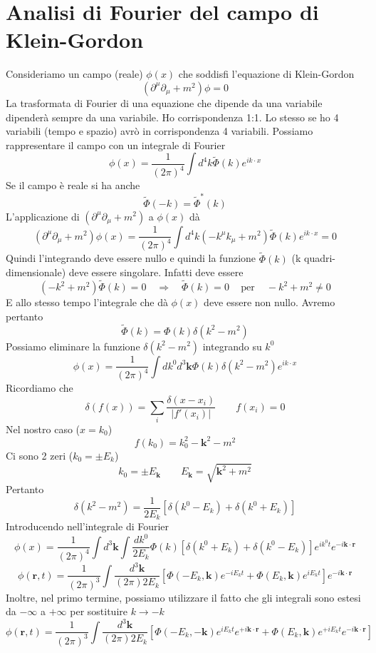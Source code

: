 \section{Analisi di Fourier del campo di Klein-Gordon}
Consideriamo un campo (reale) $\phi(x)$ che soddisfi l'equazione di Klein-Gordon
$$
(\partial^\mu \partial_\mu + m^2)\phi = 0
$$
La trasformata di Fourier di una equazione che dipende da una variabile dipenderà sempre da una variabile. Ho corrispondenza 1:1. Lo stesso se ho 4 variabili (tempo e spazio) avrò in corrispondenza 4 variabili.
Possiamo rappresentare il campo con un integrale di Fourier
$$
\phi(x) = \frac{1}{(2\pi)^4} \int d^4k \tilde{\Phi}(k) e^{ik \cdot x}
$$
Se il campo è reale si ha anche 
$$
\tilde{\Phi}(-k) = \tilde{\Phi}^*(k)
$$
L'applicazione di $\left(\partial^\mu\partial_\mu+m^2\right)$ a $\phi(x)$ dà
$$
(\partial^\mu \partial_\mu + m^2)\phi(x) = \frac{1}{(2\pi)^4} \int d^4k (-k^\mu k_\mu + m^2) \tilde{\Phi}(k) e^{ik \cdot x} = 0
$$
Quindi l'integrando deve essere nullo e quindi la funzione $\tilde{\Phi}(k)$ (k quadri-dimensionale) deve essere singolare. Infatti deve essere
$$
(-k^2 + m^2) \tilde{\Phi}(k) = 0 \quad \Rightarrow \quad \tilde{\Phi}(k)=0\,\,\,\,\, \text{ per } \,\,\,\,\,-k^2+m^2\not=0
$$
E allo stesso tempo l'integrale che dà $\phi(x)$ deve essere non nullo. Avremo pertanto
$$
\tilde{\Phi}(k) = \Phi(k) \delta(k^2 - m^2)
$$
Possiamo eliminare la funzione $\delta(k^2 - m^2)$ integrando su $k^0$
$$
\phi(x) = \frac{1}{(2\pi)^4} \int dk^0 d^3\mathbf{k} \Phi(k) \delta(k^2 - m^2) e^{ik \cdot x}
$$
Ricordiamo che
$$
\delta(f(x)) = \sum_i \frac{\delta(x - x_i)}{|f'(x_i)|} \qquad f(x_i) = 0
$$
Nel nostro caso ($x=k_0$)
$$
f(k_0) = k_0^2 - \mathbf{k}^2 - m^2
$$
Ci sono 2 zeri ($k_0=\pm E_k$)
$$
k_0 = \pm E_{\mathbf{k}} \qquad E_{\mathbf{k}} = \sqrt{\mathbf{k}^2 + m^2}
$$
Pertanto
$$
\delta(k^2 - m^2) = \frac{1}{2E_k} [\delta(k^0 - E_k) + \delta(k^0 + E_k)]
$$
Introducendo nell'integrale di Fourier
$$
\phi(x) = \frac{1}{(2\pi)^4} \int d^3\mathbf{k} \int \frac{dk^0}{2E_k} \Phi(k) [\delta(k^0 + E_k) + \delta(k^0 - E_k)] e^{ik^0t} e^{-i\mathbf{k}\cdot\mathbf{r}}
$$
$$
\phi(\mathbf{r}, t) = \frac{1}{(2\pi)^3} \int \frac{d^3\mathbf{k}}{(2\pi)2E_k} [\Phi(-E_k, \mathbf{k}) e^{-iE_k t} + \Phi(E_k, \mathbf{k}) e^{iE_k t}] e^{-i\mathbf{k}\cdot\mathbf{r}}
$$
Inoltre, nel primo termine, possiamo utilizzare il fatto che gli integrali sono estesi da $-\infty$ a $+\infty$ per sostituire $k\to-k$
$$
\phi(\mathbf{r}, t) = \frac{1}{(2\pi)^3} \int \frac{d^3\mathbf{k}}{(2\pi)2E_k} [\Phi(-E_k, -\mathbf{k}) e^{iE_k t} e^{+i\mathbf{k}\cdot\mathbf{r}} + \Phi(E_k, \mathbf{k}) e^{+iE_k t} e^{-i\mathbf{k}\cdot\mathbf{r}}]
$$

